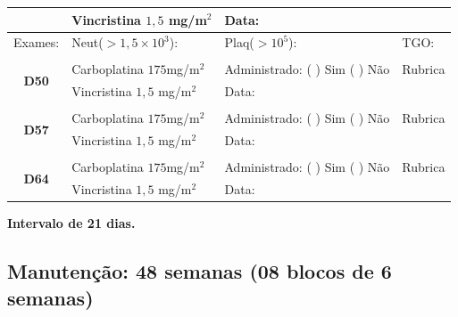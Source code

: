 \documentclass[11pt,a4paper,oldfontcommands]{memoir}
\begin{document}
\begin{center}
\begin{longtable}{p{1cm}p{4cm}|p{5cm}|p{3cm}}
    \multicolumn{1}{c|}{}&{Vincristina \(1,5\) mg/m\(^2\)}&{Data:}&\\
    \hline
    \multicolumn{1}{c|}{Exames:}&{Neut(\(>1,5\times10^3\)):}&{Plaq(\(>10^5\)):}&{TGO:}
    \\
    \hline
    \\
	\hline
    \multicolumn{1}{c|}{\multirow{2}{*}{\textbf{D50}}}&{Carboplatina \(175\)mg/m\(^2\)}&{Administrado: (  ) Sim (  ) Não}&{Rubrica}\\
    \multicolumn{1}{c|}{}&{Vincristina \(1,5\) mg/m\(^2\)}&{Data:}&\\
    \hline
    \\
    \hline
    \multicolumn{1}{c|}{\multirow{2}{*}{\textbf{D57}}}&{Carboplatina \(175\)mg/m\(^2\)}&{Administrado: (  ) Sim (  ) Não}&{Rubrica}\\
    \multicolumn{1}{c|}{}&{Vincristina \(1,5\) mg/m\(^2\)}&{Data:}&\\
    \hline
    \\
    \hline
    \multicolumn{1}{c|}{\multirow{2}{*}{\textbf{D64}}}&{Carboplatina \(175\)mg/m\(^2\)}&{Administrado: (  ) Sim (  ) Não}&{Rubrica}\\
    \multicolumn{1}{c|}{}&{Vincristina \(1,5\) mg/m\(^2\)}&{Data:}&\\
    \hline
\end{longtable}
\textbf{Intervalo de 21 dias.}
\end{center}

\subsection{Manutenção: 48 semanas (08 blocos de 6 semanas)}
\end{document}
